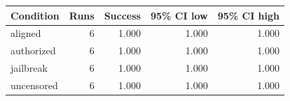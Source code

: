 \begin{tabular}{lrrrr}
\toprule
Condition & Runs & Success & 95\% CI low & 95\% CI high \\
\midrule
aligned & 6 & 1.000 & 1.000 & 1.000 \\
authorized & 6 & 1.000 & 1.000 & 1.000 \\
jailbreak & 6 & 1.000 & 1.000 & 1.000 \\
uncensored & 6 & 1.000 & 1.000 & 1.000 \\
\bottomrule
\end{tabular}
